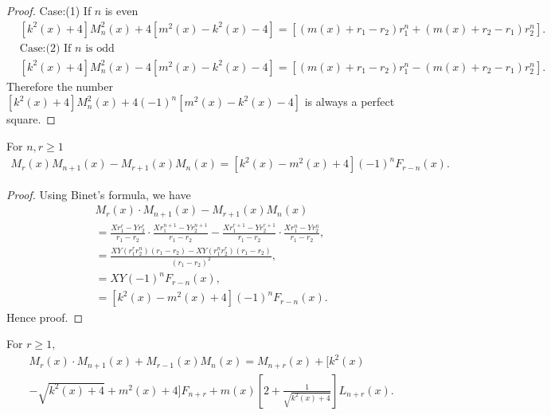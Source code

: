\begin{proof}
Case:(1) If $n$ is even
\begin{align*}
&{[k^{2}(x)+4]}M_{n}^2(x)+4{[m^{2}(x)-k^{2}(x)-4]}={[(m(x)+r_{1}-r_{2})r_{1}^n+(m(x)+r_{2}-r_{1})r_{2}^n]}.\\
&\text{Case:(2) If $n$ is odd}\\
&{[k^{2}(x)+4]}M_{n}^2(x)-4{[m^{2}(x)-k^{2}(x)-4]}={[(m(x)+r_{1}-r_{2})r_{1}^n-(m(x)+r_{2}-r_{1})r_{2}^n]}.
\end{align*}
Therefore the number $\left[ k^{2}(x)+4\right] M_{n}^2(x)+4{(-1)}^n\left[ m^{2}(x)-k^{2}(x)-4\right]$ is always a perfect square.
\end{proof}
\begin{theorem}
For $n,r\geq{1}$
\begin{align}
M_{r}(x)M_{n+1}(x)-M_{r+1}(x)M_{n}(x)=[k^{2}(x)-m^{2}(x)+4](-1)^nF_{r-n}(x).
\end{align}
\end{theorem}
\begin{proof}
Using Binet's formula,  we have
\begin{align*}
&M_{r}(x)\cdot M_{n+1}(x)-M_{r+1}(x)M_{n}(x)\\&=\frac{Xr_{1}^r-Yr_{2}^r}{r_{1}-r_{2}}\cdot\frac{Xr_{1}^{n+1}-Yr_{2}^{n+1}}
{r_{1}-r_{2}}-\frac{Xr_{1}^{r+1}-Yr_{2}^{r+1}}{r_{1}-r_{2}}\cdot\frac{Xr_{1}^{n}-Yr_{2}^{n}}{r_{1}-r_{2}},\\
&=\frac{XY(r_{1}^rr_{2}^n)(r_{1}-r_{2})-XY(r_{1}^nr_{2}^r)(r_{1}-r_{2})}{(r_{1}-r_{2})^2},\\
&={XY(-1)^nF_{r-n}(x)},\\
&=[k^{2}(x)-m^{2}(x)+4](-1)^nF_{r-n}(x).
\end{align*}
Hence proof.
\end{proof}
\begin{theorem}
For $r\geq{1},$
\begin{align*}
&M_{r}(x)\cdot M_{n+1}(x)+M_{r-1}(x)M_{n}(x)=M_{n+r}(x)+[k^2(x)\\&-\sqrt{k^{2}(x)+4}+m^{2}(x)+4]F_{n+r}+m(x)[2+\frac{1}{\sqrt{k^{2}(x)+4}}]L_{n+r}(x).
\end{align*}
\end{theorem}
